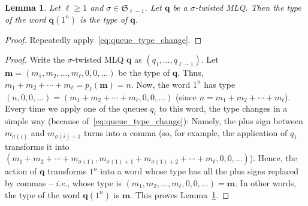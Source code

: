 \documentclass[reqno]{amsart}
\newcommand{\0}{\phantom{c}}
\newcommand{\SymGp}[1]{\mathfrak{S}_{#1}} %
\newcommand{\mm}{\mathbf{m}}
\newcommand{\qq}{\mathbf{q}}
\newenvironment{verlong}{}{}
\newenvironment{vershort}{}{}
\newcommand{\tup}[1]{\left( #1 \right)}
\theoremstyle{plain}
\newtheorem{lemma}[thm]{Lemma}
\theoremstyle{definition}
\numberwithin{equation}{section}
\begin{document}
\begin{lemma}
\label{rmk:mlq-type}
Let $\ell \geq 1$ and $\sigma \in \SymGp{\ell-1}$.
Let $\qq$ be a $\sigma$-twisted MLQ.
Then the type of the word $\qq(1^n)$ is the type of $\qq$.
\end{lemma}

\begin{vershort}
\begin{proof}
Repeatedly apply~\eqref{eq:queue_type_change}.
\end{proof}
\end{vershort}

\begin{verlong}
\begin{proof}
Write the $\sigma$-twisted MLQ $\qq$ as $\tup{q_1, \ldots, q_{\ell-1}}$.
Let $\mm = \tup{m_1, m_2, \ldots, m_\ell, 0, 0, \ldots}$ be the type of $\qq$.
Thus, $m_1 + m_2 + \cdots + m_\ell = p_{\ell}(\mm) = n$.
Now, the word $1^n$ has type $\tup{n, 0, 0, \ldots} = \tup{m_1 + m_2 + \cdots + m_\ell, 0, 0, \ldots}$
(since $n = m_1 + m_2 + \cdots + m_\ell$).
Every time we apply one of the queues $q_i$ to this word, the type changes in a simple way (because of~\eqref{eq:queue_type_change}): Namely, the plus sign between $m_{\sigma(i)}$ and $m_{\sigma(i)+1}$ turns into a comma (so, for example, the application of $q_1$ transforms it into $\tup{m_1 + m_2 + \cdots + m_{\sigma(1)}, m_{\sigma(1)+1} + m_{\sigma(1)+2} + \cdots + m_\ell, 0, 0, \ldots}$).
Hence, the action of $\qq$ transforms $1^n$ into a word whose type has all the plus signs replaced by commas -- \textit{i.e.}, whose type is $\tup{m_1, m_2, \ldots, m_\ell, 0, 0, \ldots} = \mm$.
In other words, the type of the word $\qq(1^n)$ is $\mm$.
This proves Lemma~\ref{rmk:mlq-type}.


\end{proof}
\end{verlong}
\end{document}
